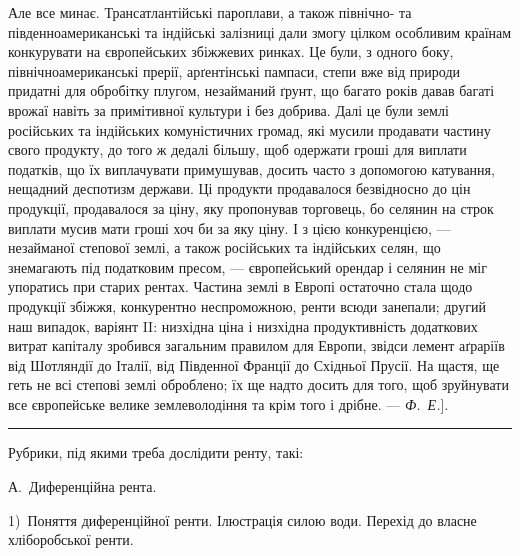Але все минає. Трансатлантійські пароплави, а також північно- та південноамериканські
та індійські залізниці дали змогу цілком особливим країнам конкурувати
на європейських збіжжевих ринках. Це були, з одного боку, північноамериканські
прерії, арґентінські пампаси, степи вже від природи придатні для
обробітку плугом, незайманий ґрунт, що багато років давав багаті врожаї навіть
за примітивної культури і без добрива. Далі це були землі російських та
індійських комуністичних громад, які мусили продавати частину свого продукту,
до того ж дедалі більшу, щоб одержати гроші для виплати податків, що їх виплачувати
примушував, досить часто з допомогою катування, нещадний деспотизм
держави. Ці продукти продавалося безвідносно до цін продукції, продавалося
за ціну, яку пропонував торговець, бо селянин на строк виплати мусив
мати гроші хоч би за яку ціну. І з цією конкуренцією, — незайманої степової
землі, а також російських та індійських селян, що знемагають під податковим пресом,
— європейський орендар і селянин не міг упоратись при старих рентах. Частина
землі в Европі остаточно стала щодо продукції збіжжя, конкурентно неспроможною,
ренти всюди занепали; другий наш випадок, варіянт II: низхідна ціна
і низхідна продуктивність додаткових витрат капіталу зробився загальним
правилом для Европи, звідси лемент аґраріїв від Шотляндії до Італії, від Південної
Франції до Східньої Прусії. На щастя, ще геть не всі степові землі
оброблено; їх ще надто досить для того, щоб зруйнувати все європейське велике
землеволодіння та крім того і дрібне. — \emph{Ф.~Е.}].

\pfbreak

Рубрики, під якими треба дослідити ренту, такі:

А.~Диференційна рента.

1)~Поняття диференційної ренти. Ілюстрація силою води. Перехід до власне
хліборобської ренти.
